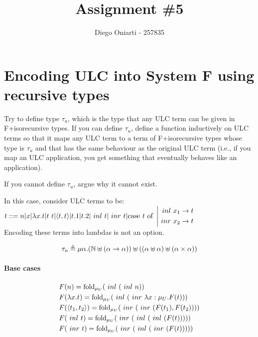 \documentclass{article}
\title{Assignment \#5}
\author{Diego Oniarti - 257835}
\date{}
\newcommand{\fold}[0]{\ensuremath{\text{fold}}}
\begin{document}
\maketitle

\section{Encoding ULC into System F using recursive types}
Try to define type $\tau_u$, which is the type that any ULC term can be given in F+isorecursive types. If you can define $\tau_u$, define a function inductively on ULC terms so that it maps any ULC term to a term of F+isorecursive types whose type is $\tau_u$ and that has the same behaviour as the original ULC term (i.e., if you map an ULC application, you get something that eventually behaves like an application).

If you cannot define $\tau_u$, argue why it cannot exist.

In this case, consider ULC terms to be: $t ::= n | x | \lambda x.t | t\ t | \langle t, t\rangle | t.1 | t.2 | \ inl\  t | \ inr\  t | \text{case}\ t\ \text{of}\ \left|\begin{aligned}\ inl\  x_1 \to t\\\ inr\  x_2 \to t\end{aligned}\right.$ \\
Encoding these terms into lambdas is not an option.

\hline

\begin{align*}
    \tau_u \triangleq \mu\alpha. (\mathbb N \uplus (\alpha\to\alpha)) \uplus ((\alpha\uplus\alpha) \uplus (\alpha\times\alpha))
\end{align*}

\paragraph{Base cases}
\begin{align*}
        & F(n) = \fold_{\mu_U}(\inl(\inl n)) \\
        & F(\lam{x}{t}) = \fold_{\mu_U}(\inl(\inr \lam{x:\mu_U}{F(t)})) \\
        & F(\langle t_1,t_2 \rangle) = \fold_{\mu_U}(\inr(\inr(F(t_1),F(t_2)))) \\
        & F(\inl t) = \fold_{\mu_U}(\inr (\inl (\inl(F(t))))) \\
        & F(\inr t) = \fold_{\mu_U}(\inr (\inl (\inr(F(t))))) \\
\end{align*}
\end{document}
